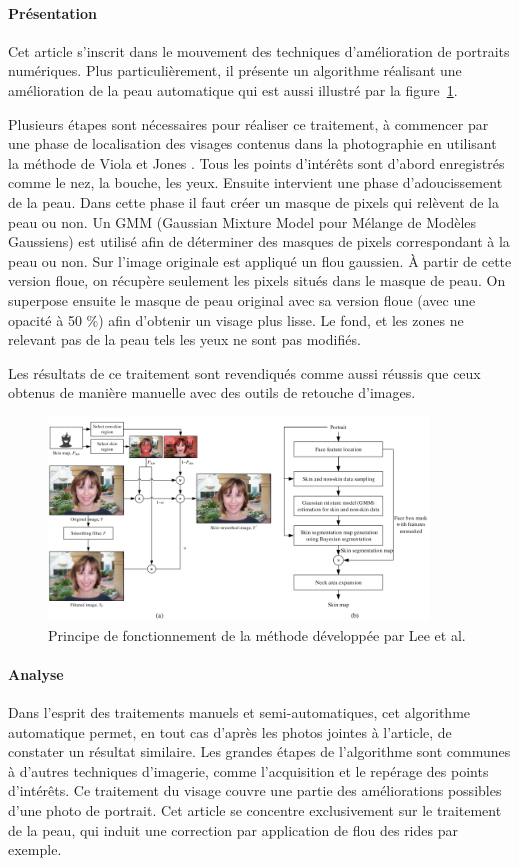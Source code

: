 \documentclass[11pt, french]{report-rd-info}
\begin{document}
\paragraph{Présentation}
Cet article s'inscrit dans le mouvement des techniques d'amélioration de portraits numériques.
Plus particulièrement, il présente un algorithme réalisant une amélioration de la peau automatique qui est aussi illustré par la figure~\ref{fig:FonctionnementLee}.

Plusieurs étapes sont nécessaires pour réaliser ce traitement, à commencer par une phase de localisation des visages contenus dans la photographie en utilisant la méthode de Viola et Jones \cite{Viola2004}.
Tous les points d'intérêts sont d'abord enregistrés comme le nez, la bouche, les yeux.
Ensuite intervient une phase d'adoucissement de la peau.
Dans cette phase il faut créer un masque de pixels qui relèvent de la peau ou non.
Un GMM (Gaussian Mixture Model pour Mélange de Modèles Gaussiens) est utilisé afin de déterminer des masques de pixels correspondant à la peau ou non.
Sur l’image originale est appliqué un flou gaussien. À partir de cette version floue, on récupère seulement les pixels situés dans le masque de peau. On superpose ensuite le masque de peau original avec sa version floue (avec une opacité à 50 \%) afin d’obtenir un visage plus lisse. Le fond, et les zones ne relevant pas de la peau tels les yeux ne sont pas modifiés.

Les résultats de ce traitement sont revendiqués comme aussi réussis que ceux obtenus de manière manuelle avec des outils de retouche d'images.
\begin{figure}
	\centering
\includegraphics[width=0.9\textwidth]{Images/ea_algo_smoothing}
	\caption{Principe de fonctionnement de la méthode développée par Lee et al. \cite{Lee}}
	\label{fig:FonctionnementLee}
\end{figure}
\paragraph{Analyse}
Dans l'esprit des traitements manuels et semi-automatiques, cet algorithme automatique permet, en tout cas d'après les photos jointes à l'article, de constater un résultat similaire.
Les grandes étapes de l'algorithme sont communes à d'autres techniques d'imagerie, comme l'acquisition et le repérage des points d'intérêts.
Ce traitement du visage couvre une partie des améliorations possibles d'une photo de portrait. Cet article se concentre exclusivement sur le traitement de la peau, qui induit une correction par application de flou des rides par exemple.
\end{document}
